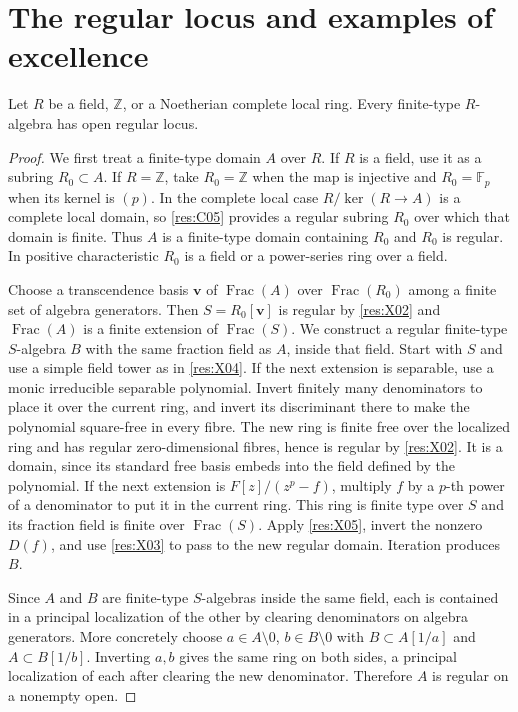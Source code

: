 \section[The regular locus]{The regular locus and examples of excellence}

\begin{theorem}\label{res:X08}
Let \(R\) be a field, \(\mathbb Z\), or a Noetherian complete local ring. Every finite-type \(R\)-algebra has open regular locus.
\end{theorem}
\begin{proof}
We first treat a finite-type domain \(A\) over \(R\). If \(R\) is a field, use it as a subring \(R_0\subset A\). If \(R=\mathbb Z\), take \(R_0=\mathbb Z\) when the map is injective and \(R_0=\mathbb F_p\) when its kernel is \((p)\). In the complete local case \(R/\ker(R\to A)\) is a complete local domain, so \ref{res:C05} provides a regular subring \(R_0\) over which that domain is finite. Thus \(A\) is a finite-type domain containing \(R_0\) and \(R_0\) is regular. In positive characteristic \(R_0\) is a field or a power-series ring over a field.

Choose a transcendence basis \(\mathbf v\) of \(\operatorname{Frac}(A)\) over \(\operatorname{Frac}(R_0)\) among a finite set of algebra generators. Then \(S=R_0[\mathbf v]\) is regular by \ref{res:X02} and \(\operatorname{Frac}(A)\) is a finite extension of \(\operatorname{Frac}(S)\). We construct a regular finite-type \(S\)-algebra \(B\) with the same fraction field as \(A\), inside that field. Start with \(S\) and use a simple field tower as in \ref{res:X04}. If the next extension is separable, use a monic irreducible separable polynomial. Invert finitely many denominators to place it over the current ring, and invert its discriminant there to make the polynomial square-free in every fibre. The new ring is finite free over the localized ring and has regular zero-dimensional fibres, hence is regular by \ref{res:X02}. It is a domain, since its standard free basis embeds into the field defined by the polynomial. If the next extension is \(F[z]/(z^p-f)\), multiply \(f\) by a \(p\)-th power of a denominator to put it in the current ring. This ring is finite type over \(S\) and its fraction field is finite over \(\operatorname{Frac}(S)\). Apply \ref{res:X05}, invert the nonzero \(D(f)\), and use \ref{res:X03} to pass to the new regular domain. Iteration produces \(B\).

Since \(A\) and \(B\) are finite-type \(S\)-algebras inside the same field, each is contained in a principal localization of the other by clearing denominators on algebra generators. More concretely choose \(a\in A\setminus0\), \(b\in B\setminus0\) with \(B\subset A[1/a]\) and \(A\subset B[1/b]\). Inverting \(a,b\) gives the same ring on both sides, a principal localization of each after clearing the new denominator. Therefore \(A\) is regular on a nonempty open.


\end{proof}
